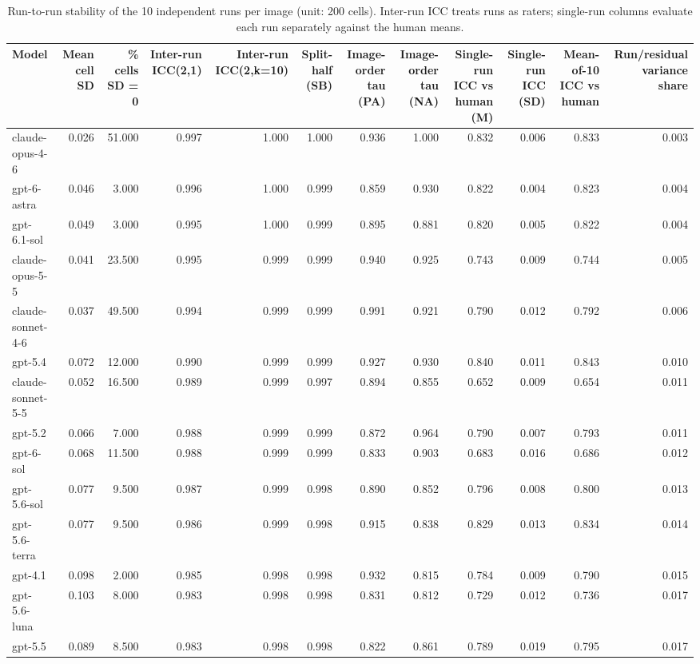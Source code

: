 \begin{table}
\caption{Run-to-run stability of the 10 independent runs per image (unit: 200 cells). Inter-run ICC treats runs as raters; single-run columns evaluate each run separately against the human means.}
\begin{tabular}{lrrrrrrrrrrr}
\toprule
Model & Mean cell SD & \% cells SD = 0 & Inter-run ICC(2,1) & Inter-run ICC(2,k=10) & Split-half (SB) & Image-order tau (PA) & Image-order tau (NA) & Single-run ICC vs human (M) & Single-run ICC (SD) & Mean-of-10 ICC vs human & Run/residual variance share \\
\midrule
claude-opus-4-6 & 0.026 & 51.000 & 0.997 & 1.000 & 1.000 & 0.936 & 1.000 & 0.832 & 0.006 & 0.833 & 0.003 \\
gpt-6-astra & 0.046 & 3.000 & 0.996 & 1.000 & 0.999 & 0.859 & 0.930 & 0.822 & 0.004 & 0.823 & 0.004 \\
gpt-6.1-sol & 0.049 & 3.000 & 0.995 & 1.000 & 0.999 & 0.895 & 0.881 & 0.820 & 0.005 & 0.822 & 0.004 \\
claude-opus-5-5 & 0.041 & 23.500 & 0.995 & 0.999 & 0.999 & 0.940 & 0.925 & 0.743 & 0.009 & 0.744 & 0.005 \\
claude-sonnet-4-6 & 0.037 & 49.500 & 0.994 & 0.999 & 0.999 & 0.991 & 0.921 & 0.790 & 0.012 & 0.792 & 0.006 \\
gpt-5.4 & 0.072 & 12.000 & 0.990 & 0.999 & 0.999 & 0.927 & 0.930 & 0.840 & 0.011 & 0.843 & 0.010 \\
claude-sonnet-5-5 & 0.052 & 16.500 & 0.989 & 0.999 & 0.997 & 0.894 & 0.855 & 0.652 & 0.009 & 0.654 & 0.011 \\
gpt-5.2 & 0.066 & 7.000 & 0.988 & 0.999 & 0.999 & 0.872 & 0.964 & 0.790 & 0.007 & 0.793 & 0.011 \\
gpt-6-sol & 0.068 & 11.500 & 0.988 & 0.999 & 0.999 & 0.833 & 0.903 & 0.683 & 0.016 & 0.686 & 0.012 \\
gpt-5.6-sol & 0.077 & 9.500 & 0.987 & 0.999 & 0.998 & 0.890 & 0.852 & 0.796 & 0.008 & 0.800 & 0.013 \\
gpt-5.6-terra & 0.077 & 9.500 & 0.986 & 0.999 & 0.998 & 0.915 & 0.838 & 0.829 & 0.013 & 0.834 & 0.014 \\
gpt-4.1 & 0.098 & 2.000 & 0.985 & 0.998 & 0.998 & 0.932 & 0.815 & 0.784 & 0.009 & 0.790 & 0.015 \\
gpt-5.6-luna & 0.103 & 8.000 & 0.983 & 0.998 & 0.998 & 0.831 & 0.812 & 0.729 & 0.012 & 0.736 & 0.017 \\
gpt-5.5 & 0.089 & 8.500 & 0.983 & 0.998 & 0.998 & 0.822 & 0.861 & 0.789 & 0.019 & 0.795 & 0.017 \\

\end{tabular}
\end{table}
